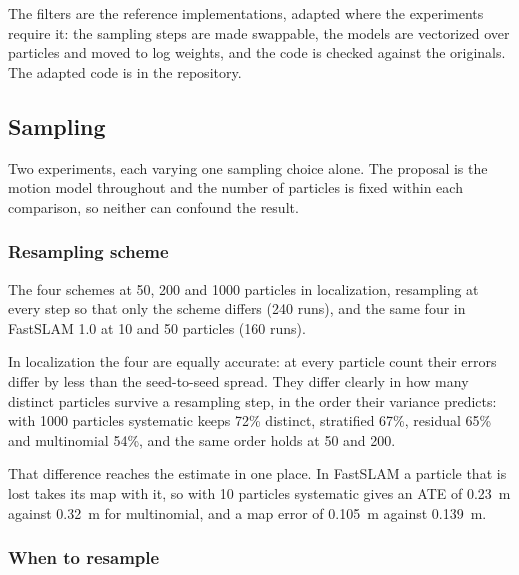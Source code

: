 The filters are the reference implementations, adapted where the experiments require it: the sampling steps are
made swappable, the models are vectorized over particles and moved to log weights, and the code is checked
against the originals. The adapted code is in the repository.

\subsection{Sampling}\label{sec:results-sampling}

Two experiments, each varying one sampling choice alone. The proposal is the motion model throughout and the
number of particles is fixed within each comparison, so neither can confound the result.

\subsubsection{Resampling scheme}

The four schemes at 50, 200 and 1000 particles in localization, resampling at every step so that only the scheme
differs (240 runs), and the same four in FastSLAM 1.0 at 10 and 50 particles (160 runs).

In localization the four are equally accurate: at every particle count their errors differ by less than the
seed-to-seed spread. They differ clearly in how many distinct particles survive a resampling step, in the order
their variance predicts: with 1000 particles systematic keeps 72\% distinct, stratified 67\%, residual 65\% and
multinomial 54\%, and the same order holds at 50 and 200.

That difference reaches the estimate in one place. In FastSLAM a particle that is lost takes its map with it, so
with 10 particles systematic gives an ATE of \SI{0.23}{\meter} against \SI{0.32}{\meter} for multinomial, and a
map error of \SI{0.105}{\meter} against \SI{0.139}{\meter}.


\subsubsection{When to resample}

